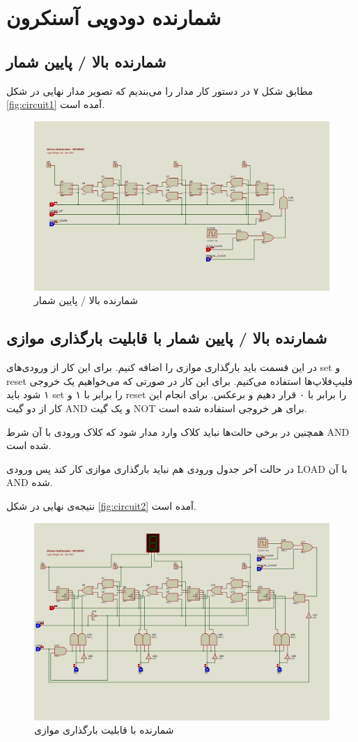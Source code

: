 \chapter{
شمارنده دودویی آسنکرون
}
\section{
شمارنده بالا
/
پایین شمار
}
مطابق شکل ۷ در دستور کار مدار را می‌بندیم که تصویر مدار نهایی در شکل
\eqref{fig:circuit1}
آمده است.

\begin{figure}
    \centering
    \includegraphics[width=\textwidth]{part1/1-1.png}
    \caption{
    شمارنده بالا
    /
    پایین شمار
    }
    \label{fig:circuit1}
\end{figure}



\section{
شمارنده بالا
/
پایین شمار
با قابلیت بارگذاری موازی
}
در این قسمت باید بارگذاری موازی را اضافه کنیم. برای این کار از ورودی‌های
set و
reset
فلیپ‌فلاپ‌ها استفاده می‌کنیم.
برای این کار در صورتی که می‌خواهیم یک خروجی ۱ شود
باید
set
را برابر با ۱ و reset را برابر
با ۰ قرار دهیم و برعکس.
برای انجام این کار
از دو گیت AND و
یک گیت NOT
برای هر خروجی استفاده شده است.

همچنین در برخی حالت‌ها نباید کلاک وارد مدار شود که کلاک ورودی با آن شرط
AND شده است.

در حالت آخر جدول ورودی هم نباید بارگذاری موازی کار کند پس ورودی
LOAD
با آن
AND
شده.

نتیجه‌ی نهایی در شکل
\eqref{fig:circuit2}
آمده است.

\begin{figure}
    \centering
    \includegraphics[width=\textwidth]{part1/1-2.png}
    \caption{
    شمارنده با قابلیت بارگذاری موازی
    }
    \label{fig:circuit2}
\end{figure}